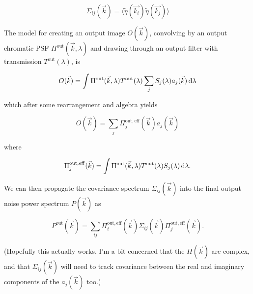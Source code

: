 \documentclass{article}
\begin{document}
\begin{equation}
  \Sigma_{ij}(\vec{k}) = \langle\tilde\eta(\vec{k_i})\tilde\eta(\vec{k_j})\rangle
\end{equation}

The model for creating an output image $O(\vec{k})$, convolving by an output chromatic PSF
$\Pi^\mathrm{out}(\vec{k}, \lambda)$ and drawing through an output filter with transmission
$T^\mathrm{out}(\lambda)$, is

\begin{equation}
  O(\vec{k}) = \int \Pi^\mathrm{out}(\vec{k}, \lambda) T^\mathrm{out}(\lambda) \sum_j S_j(\lambda) a_j(\vec{k}) \dif{\lambda}
\end{equation}

which after some rearrangement and algebra yields

\begin{equation}
  O(\vec{k}) = \sum_j \Pi_j^\mathrm{out, eff}(\vec{k}) a_j(\vec{k})
\end{equation}

where

\begin{equation}
  \Pi_j^\mathrm{out, eff}(\vec{k}) = \int \Pi^\mathrm{out}(\vec{k}, \lambda) T^\mathrm{out}(\lambda) S_j(\lambda)\dif{\lambda}.
\end{equation}

We can then propagate the covariance spectrum $\Sigma_{ij}(\vec{k})$ into the final output
noise power spectrum $P(\vec{k})$ as

\begin{equation}
  P^\mathrm{out}(\vec{k}) = \sum_{ij} \Pi_i^\mathrm{out, eff}(\vec{k}) \Sigma_{ij}(\vec{k}) \Pi_j^\mathrm{out, eff}(\vec{k}).
\end{equation}

(Hopefully this actually works.  I'm a bit concerned that the $\Pi(\vec{k})$ are complex, and that
$\Sigma_{ij}(\vec{k})$ will need to track covariance between the real and imaginary components of
the $a_j(\vec{k})$ too.)
\end{document}
